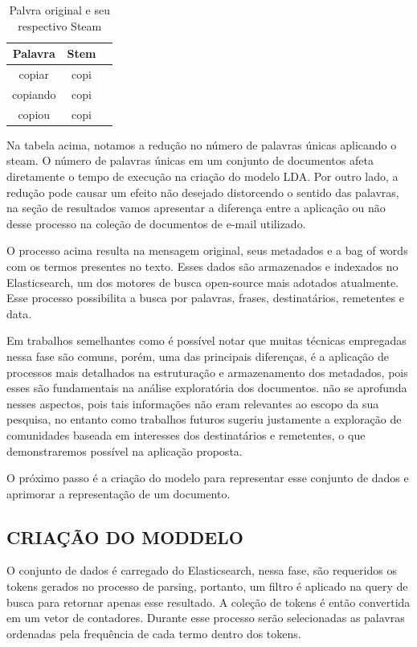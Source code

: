 \documentclass[12pt,a4paper]{article}
\begin{document}
\begin{enumerate}
  
  \begin{table}[h]
    \centering
    \begin{tabular}{c c c}
    Palavra		&Stem &\\
    \hline
    copiar		&copi &\\
    copiando		&copi &\\
    copiou		&copi &\\
    \hline
    \end{tabular}
    \caption{Palvra original e seu respectivo Steam}
  \end{table}
  
  Na tabela acima, notamos a redução no número de palavras únicas aplicando o steam. O número de palavras únicas em um conjunto de documentos afeta diretamente o tempo de execução na criação do modelo LDA. Por outro lado, a redução pode causar um efeito não desejado distorcendo o sentido das palavras, na seção de resultados vamos apresentar a diferença entre a aplicação ou não desse processo na coleção de documentos de e-mail utilizado.
  \end{enumerate}
  
  
  O processo acima resulta na mensagem original, seus metadados e a bag of words com os termos presentes no texto. Esses dados são armazenados e indexados no Elasticsearch, um dos motores de busca open-source mais adotados atualmente. Esse processo possibilita a busca por palavras, frases, destinatários, remetentes e data. 
  
  Em trabalhos semelhantes como  é possível notar que muitas técnicas empregadas nessa fase são comuns, porém, uma das principais diferenças, é a aplicação de processos mais detalhados na estruturação e armazenamento dos metadados, pois esses são fundamentais na análise exploratória dos documentos.  não se aprofunda nesses aspectos, pois tais informações não eram relevantes ao escopo da sua pesquisa, no entanto como trabalhos futuros sugeriu justamente a exploração de comunidades baseada em interesses dos destinatários e remetentes, o que demonstraremos possível na aplicação proposta.
  
  O próximo passo é a criação do modelo para representar esse conjunto de dados e aprimorar a representação de um documento.
  
  
  
  \subsection{CRIAÇÃO DO MODDELO}
  O conjunto de dados é carregado do Elasticsearch, nessa fase, são requeridos os tokens gerados no processo de parsing, portanto, um filtro é aplicado na query de busca para retornar apenas esse resultado. A coleção de tokens é então convertida em um vetor de contadores. Durante esse processo serão selecionadas as palavras ordenadas pela frequência de cada termo dentro dos tokens.
  
\end{document}
